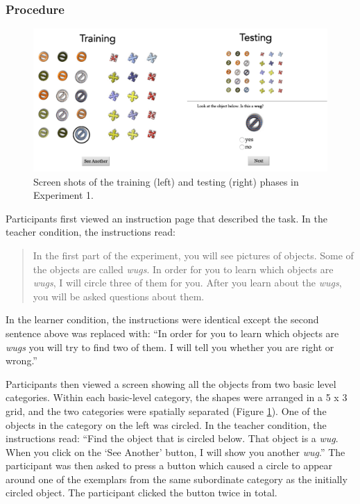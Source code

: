 \documentclass[man]{apa2}
\begin{document}
\subsubsection{Procedure}
 \begin{figure} [t]
 \begin{center} 
 \includegraphics[width=5.5in]{figures/screen.png} 
 \caption{\label{fig:screen} Screen shots of the training (left) and testing (right) phases in Experiment 1. } 
 \end{center} 
\end{figure}


Participants first viewed an instruction page that described the task. In the teacher condition, the instructions read: 
\begin{quote}
In the first part of the experiment, you will see pictures of objects. Some of the objects are called \textit{wugs}. In order for you to learn which objects are \textit{wugs}, I will circle three of them for you. After you learn about the \textit{wugs}, you will be asked questions about them.
\end{quote}
In the learner condition, the instructions were identical except the second sentence above was replaced with: ``In order for you to learn which objects are \textit{wugs} you will try to find two of them. I will tell you whether you are right or wrong.''

Participants then viewed a screen showing all the objects from two basic level categories. Within each basic-level category, the shapes were arranged in a 5 x 3 grid, and the two categories were spatially separated (Figure \ref{fig:screen}). One of the objects in the category on the left was circled. In the teacher condition, the instructions read: ``Find the object that is circled below. That object is a \textit{wug}. When you click on the `See Another' button, I will show you another \textit{wug}.'' The participant was then asked to press a button which caused a circle to appear around one of the exemplars from the same subordinate category as the initially circled object. The participant clicked the button twice in total. 
\end{document}
